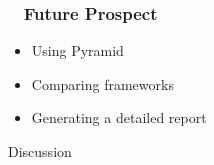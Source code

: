 \documentclass[xcolor={dvipsnames}]{beamer}
\begin{document}
\begin{frame}
\frametitle{ ~ Future Prospect} 
\begin{itemize}
\item{Using Pyramid}
\item{Comparing frameworks}
\item{Generating a detailed report}
\end{itemize}
\end{frame}



\begin{frame}
\begin{center}
\Huge{Discussion}
\end{center}
\end{frame}

\end{document}
